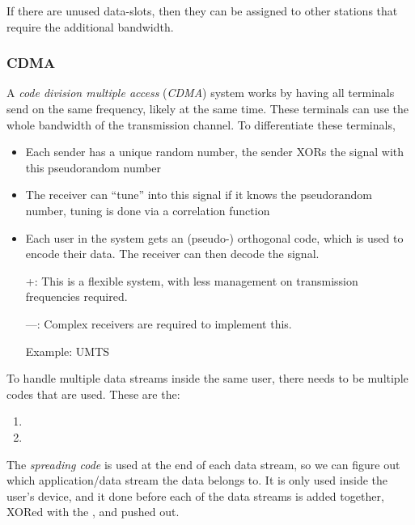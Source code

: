 If there are unused data-slots, then they can be assigned to other stations that require the additional bandwidth.

\subsubsection{CDMA}\label{subsubsec:CDMA}
\begin{definition}\label{def:CDMA}
  A \emph{code division multiple access} (\emph{CDMA}) system works by having all terminals send on the same frequency, likely at the same time.
  These terminals can use the whole bandwidth of the transmission channel.
  To differentiate these terminals,
  \begin{itemize}[noitemsep]
  \item Each sender has a unique random number, the sender XORs the signal with this pseudorandom number
  \item The receiver can ``tune'' into this signal if it knows the pseudorandom number, tuning is done via a correlation function
  \end{itemize}

  \begin{itemize}[noitemsep]
  \item Each user in the system gets an (pseudo-) orthogonal code, which is used to encode their data. The receiver can then decode the signal.
  \item [+:] This is a flexible system, with less management on transmission frequencies required.
  \item [---:] Complex receivers are required to implement this.
  \item [Example:] UMTS
  \end{itemize}
\end{definition}

To handle multiple data streams inside the same user, there needs to be multiple codes that are used.
These are the:
\begin{enumerate}[noitemsep]
\item {}
\item {}
\end{enumerate}

\begin{definition}\label{def:Spreading_Code}
  The \emph{spreading code} is used at the end of each data stream, so we can figure out which application/data stream the data belongs to.
  It is only used inside the user's device, and it done before each of the data streams is added together, XORed with the , and pushed out.
\end{definition}

